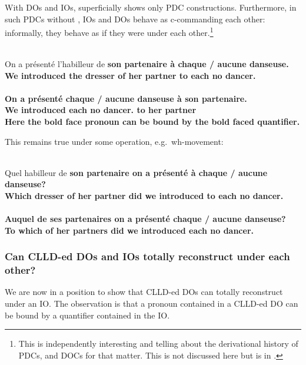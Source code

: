 \documentclass[output=paper]{langsci/langscibook}
\begin{document}
With \glspl{DO} and \glspl{IO},  superficially shows only
\gls{PDC} constructions.  Furthermore, in
such \glspl{PDC} without  , IOs and DOs behave as c-commanding
each other: informally, they behave as if they were under each
other.\footnote{This is independently interesting and telling about the
    derivational history of \glspl{PDC}, and \glspl{DOC} for that matter. This is  not discussed here but is in
\textcite{Sportiche2017}.}

\ea \label{doio1}
\\
\gll On {a pr\'{e}sent\'{e}} l'habilleur de \bf{son} partenaire \`{a}
\textbf{chaque} / \textbf{aucune} danseuse.\\
We introduced {the dresser} of her partner to each {} no dancer.\glossF{} \\
\\
\gll On {a pr\'{e}sent\'{e}} \textbf{chaque} / \textbf{aucune} danseuse \`{a}
\bf{son} partenaire.\\
We introduced each {} no dancer.\glossF{} to her partner\\
\z
\z
%
Here the bold face pronoun can be bound by the bold faced quantifier.

This remains true under some  operation, e.g.\ wh-movement:

\ea \label{doio2}
\\
\gll Quel habilleur de \bf{son} partenaire on {a pr\'{e}sent\'{e}} \`{a} \textbf{chaque} / \textbf{aucune} danseuse?\\
Which dresser of her {partner did} we introduced to each {} no dancer.\glossF{} \\
\\
\gll  Auquel de  \bf{ses} partenaires on {a pr\'{e}sent\'{e}} \textbf{chaque} / \textbf{aucune} danseuse?\\
{To which} of her {partners did} we introduced each {} no dancer.\glossF{} \\
\z
\z

\subsubsection{Can CLLD-ed DOs and IOs totally reconstruct
under each other?}\label{frozenscope}

We are now in a position to show that \gls{CLLD}-ed \glspl{DO} can totally
reconstruct under an  IO. The observation is that a pronoun contained in a
\gls{CLLD}-ed \gls{DO} can be bound by a quantifier contained in the \gls{IO}.
\end{document}

